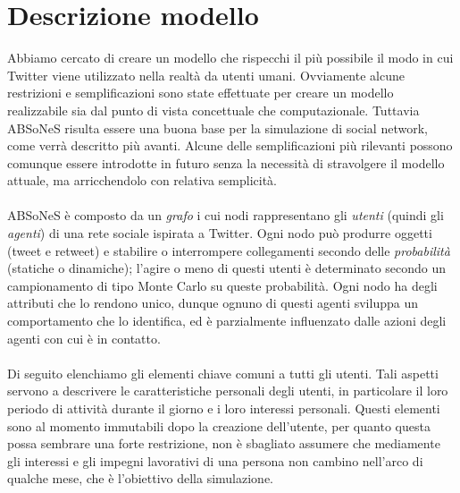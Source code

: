 \documentclass[a4paper,12pt]{article}
\begin{document}
\section{Descrizione modello} 
\label{sec:mod}
Abbiamo cercato di creare un modello che rispecchi il pi\`u possibile il modo in cui Twitter viene utilizzato nella realt\`a da utenti umani. Ovviamente alcune restrizioni e semplificazioni sono state effettuate per creare un modello realizzabile sia dal punto di vista concettuale che computazionale. Tuttavia ABSoNeS risulta essere una buona base per la simulazione di social network, come verrà descritto più avanti. Alcune delle semplificazioni pi\`u rilevanti possono comunque essere introdotte in futuro senza la necessit\`a di stravolgere il modello attuale, ma arricchendolo con relativa semplicit\`a.
\\ \\
ABSoNeS è composto da un \textit{grafo} i cui nodi rappresentano gli \textit{utenti} (quindi gli \textit{agenti}) di una rete sociale ispirata a Twitter. Ogni nodo può produrre oggetti (tweet e retweet) e stabilire o interrompere collegamenti secondo delle \textit{probabilità} (statiche o dinamiche); l'agire o meno di questi utenti è determinato secondo un campionamento di tipo Monte Carlo su queste probabilità. Ogni nodo ha degli attributi che lo rendono unico, dunque ognuno di questi agenti sviluppa un comportamento che lo identifica, ed è parzialmente influenzato dalle azioni degli agenti con cui è in contatto. 
\\ \\
Di seguito elenchiamo gli elementi chiave comuni a tutti gli utenti. Tali aspetti servono a descrivere le caratteristiche personali degli utenti, in particolare il loro periodo di attivit\`a durante il giorno e i loro interessi personali.
Questi elementi sono al momento immutabili dopo la creazione dell'utente, per quanto questa possa sembrare una forte restrizione, non \`e sbagliato assumere che mediamente gli interessi e gli impegni lavorativi di una persona non cambino nell'arco di qualche mese, che \`e l'obiettivo della simulazione.
\end{document}
